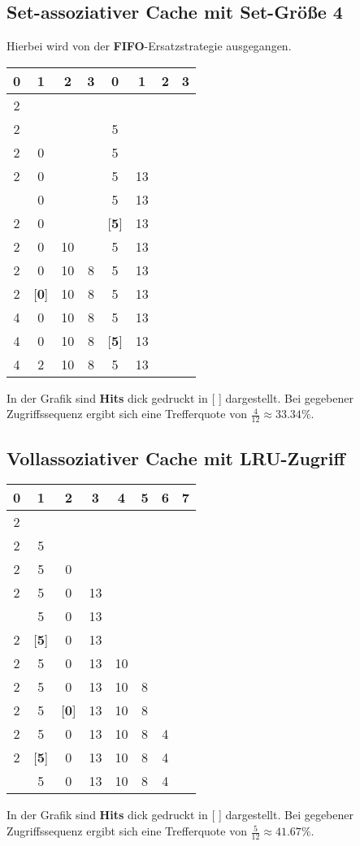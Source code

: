 \documentclass[12pt,a4paper]{scrartcl}
\begin{document}
		\subsection*{Set-assoziativer Cache mit Set-Größe 4}
		Hierbei wird von der \textbf{FIFO}-Ersatzstrategie ausgegangen.\\
		\begin{longtable}{|cccc||cccc|}
			\hline
			0&1&2&3&0&1&2&3\\
			\hline
			2&&&&&&&\\
			\hline
			2&&&&5&&&\\
			\hline
			2&0&&&5&&&\\
			\hline
			2&0&&&5&13&&\\
			\hline
			[\textbf{2}]&0&&&5&13&&\\
			\hline
			2&0&&&[\textbf{5}]&13&&\\
			\hline
			2&0&10&&5&13&&\\
			\hline
			2&0&10&8&5&13&&\\
			\hline
			2&[\textbf{0}]&10&8&5&13&&\\
			\hline
			4&0&10&8&5&13&&\\
			\hline
			4&0&10&8&[\textbf{5}]&13&&\\
			\hline
			4&2&10&8&5&13&&\\
			\hline 
		\end{longtable}
		In der Grafik sind \textbf{Hits} dick gedruckt in [ ]   dargestellt.
		Bei gegebener Zugriffssequenz ergibt sich eine Trefferquote von \(\frac{4}{12} \approx 33.34\% \).
		
		\subsection*{Vollassoziativer Cache mit LRU-Zugriff}
		
		\begin{longtable}{|cccccccc|}
			\hline
			0&1&2&3&4&5&6&7\\
			\hline
			2&&&&&&&\\
			\hline
			2&5&&&&&&\\
			\hline
			2&5&0&&&&&\\
			\hline
			2&5&0&13&&&&\\
			\hline
			[\textbf{2}]&5&0&13&&&&\\
			\hline
			2&[\textbf{5}]&0&13&&&&\\
			\hline
			2&5&0&13&10&&&\\
			\hline
			2&5&0&13&10&8&&\\
			\hline
			2&5&[\textbf{0}]&13&10&8&&\\
			\hline
			2&5&0&13&10&8&4&\\
			\hline
			2&[\textbf{5}]&0&13&10&8&4&\\
			\hline
			[\textbf{2}]&5&0&13&10&8&4&\\
			\hline 
		\end{longtable}
		In der Grafik sind \textbf{Hits} dick gedruckt in [ ] dargestellt.
		Bei gegebener Zugriffssequenz ergibt sich eine Trefferquote von \(\frac{5}{12} \approx 41.67\% \).
\end{document}

